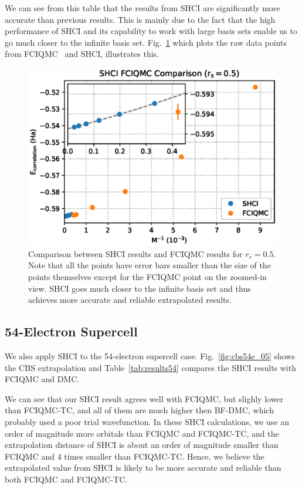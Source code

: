 We can see from this table that the results from SHCI are significantly more accurate than previous results.
This is mainly due to the fact that the high performance of SHCI and its capability to work with large basis sets enable us to go much closer to the infinite basis set. Fig.~\ref{fig:comparison} which plots the raw data points from FCIQMC~\cite{shepherd2012full} and SHCI, illustrates this.
\begin{figure}
  \begin{center}
  \includegraphics[width=\linewidth]{figs/compare.eps}
  \end{center}
  \vspace{-0.2cm}
  \caption{Comparison between SHCI results and FCIQMC results for $r_s=0.5$.
  Note that all the points have error bars smaller than the size of the points themselves except for the FCIQMC point on the zoomed-in view.
  SHCI goes much closer to the infinite basis set and thus achieves more accurate and reliable extrapolated results.
  }
  \label{fig:comparison}
\end{figure}

\subsection{54-Electron Supercell}
We also apply SHCI to the 54-electron supercell case.
Fig.~\ref{fig:cbs54e_05} shows the CBS extrapolation and Table~\ref{tab:results54} compares the SHCI results with FCIQMC and DMC.

We can see that our SHCI result agrees well with FCIQMC, but slighly lower than FCIQMC-TC, and all of them are much higher then BF-DMC, which probably used a poor trial wavefunction.
In these SHCI calculations, we use an order of magnitude more orbitals than FCIQMC and FCIQMC-TC, and the extrapolation distance of SHCI is about an order of magnitude smaller than FCIQMC and 4 times smaller than FCIQMC-TC.
Hence, we believe the extrapolated value from SHCI is likely to be more accurate and reliable than both FCIQMC and FCIQMC-TC.

